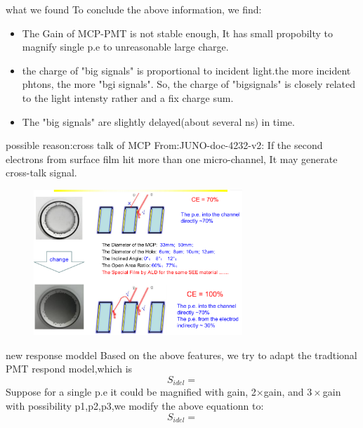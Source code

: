 \documentclass[11pt,compress,xcolor=x11names,UTF8]{beamer}
\begin{document}
\begin{frame}{what we found}
To conclude  the above information, we find:
	\begin{itemize}
		\item \alert{The Gain of MCP-PMT is not stable enough}, It has small propobilty to magnify single p.e to unreasonable large charge. 
		\item \alert{the charge of "big signals" is proportional to incident light.}the more incident phtons, the more "bgi signals". So, the charge of "bigsignals" is closely related to the light intensty rather and a fix charge sum.
		\item The "big signals" are slightly \alert{delayed(about several ns) in time.}
	\end{itemize}
\end{frame}
\begin{frame}{ possible reason:cross talk of MCP}
	From:JUNO-doc-4232-v2:
	If the second electrons from surface film hit more than one micro-channel, It may generate cross-talk signal. 
\begin{figure}
\centering
	\includegraphics[width=0.7\textwidth]{figure/mcpqs}
\end{figure}
\end{frame}
\begin{frame}{ new response moddel}
Based on the above features, we try to adapt the tradtional PMT respond model,which is
	\begin{equation}
		S_{idel}=
	\end{equation}
\alert{Suppose for a single p.e it could be magnified with gain, 2$\times$gain, and $3\times$gain with possibility p1,p2,p3},we modify the above equationn to:
	\begin{equation}
		S_{idel}=
	\end{equation}
\end{frame}
\end{document}

